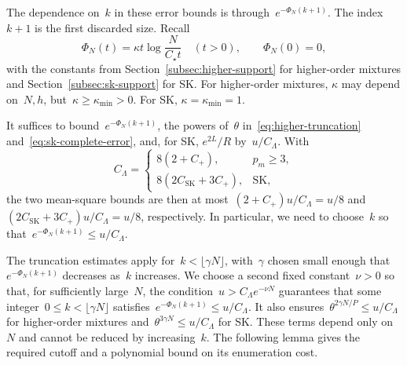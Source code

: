 \documentclass[letterpaper,11pt,reqno]{amsart}
\renewcommand{\leq}{\leqslant}
\renewcommand{\geq}{\geqslant}
\begin{document}
The dependence on~$k$ in these error bounds is through~$e^{-\Phi_N(k+1)}$. The index~$k+1$ is the first discarded size. Recall
\begin{equation}\label{eq:algorithm-support-scale}
\Phi_N(t)=\kappa t\log\frac{N}{C_\star t}\quad(t>0),
\qquad \Phi_N(0)=0,
\end{equation}
with the constants from Section~\ref{subsec:higher-support} for higher-order mixtures and Section~\ref{subsec:sk-support} for SK. For higher-order mixtures, $\kappa$ may depend on~$N,h$, but~$\kappa\geq\kappa_{\min}>0$. For SK, $\kappa=\kappa_{\min}=1$.

It suffices to bound~$e^{-\Phi_N(k+1)}$, the powers of~$\theta$ in~\eqref{eq:higher-truncation} and~\eqref{eq:sk-complete-error}, and, for SK, $e^{2L}/R$ by~$u/C_\Lambda$. With
\begin{equation}\label{eq:algorithm-cutoff-constants}
C_\Lambda=\begin{cases}
8(2+C_+),&p_m\geq3,\\
8(2C_{\mathrm{SK}}+3C_+),&\text{SK},
\end{cases}
\end{equation}
the two mean-square bounds are then at most~$(2+C_+)u/C_\Lambda=u/8$ and~$(2C_{\mathrm{SK}}+3C_+)u/C_\Lambda=u/8$, respectively. In particular, we need to choose~$k$ so that~$e^{-\Phi_N(k+1)}\leq u/C_\Lambda$.

The truncation estimates apply for~$k<\lfloor\gamma N\rfloor$, with~$\gamma$ chosen small enough that~$e^{-\Phi_N(k+1)}$ decreases as~$k$ increases. We choose a second fixed constant~$\nu>0$ so that, for sufficiently large~$N$, the condition~$u>C_\Lambda e^{-\nu N}$ guarantees that some integer~$0\leq k<\lfloor\gamma N\rfloor$ satisfies~$e^{-\Phi_N(k+1)}\leq u/C_\Lambda$. It also ensures~$\theta^{2\gamma N/P}\leq u/C_\Lambda$ for higher-order mixtures and~$\theta^{3\gamma N}\leq u/C_\Lambda$ for SK. These terms depend only on~$N$ and cannot be reduced by increasing~$k$. The following lemma gives the required cutoff and a polynomial bound on its enumeration cost.
\end{document}
